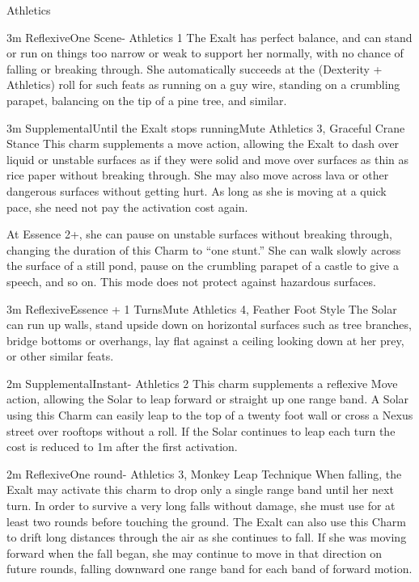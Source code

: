 \begin{Ability}{Athletics}

  {3m}
  {Reflexive}{One Scene}{-}
  {Athletics 1}
  The Exalt has perfect balance, and can stand or run on things too narrow or weak to support her normally, with no chance of falling or breaking through. She automatically succeeds at the (Dexterity + Athletics) roll for such feats as running on a guy wire, standing on a crumbling parapet, balancing on the tip of a pine tree, and similar.

  {3m}
  {Supplemental}{Until the Exalt stops running}{Mute}
  {Athletics 3, Graceful Crane Stance}
  This charm supplements a move action, allowing the Exalt to dash over liquid or unstable surfaces as if they were solid and move over surfaces as thin as rice paper without breaking through. She may also move across lava or other dangerous surfaces without getting hurt. As long as she is moving at a quick pace, she need not pay the activation cost again.

  At Essence 2+, she can pause on unstable surfaces without breaking through, changing the duration of this Charm to “one stunt.” She can walk slowly across the surface of a still pond, pause on the crumbling parapet of a castle to give a speech, and so on. This mode does not protect against hazardous surfaces.

  {3m}
  {Reflexive}{Essence + 1 Turns}{Mute}
  {Athletics 4, Feather Foot Style}
  The Solar can run up walls, stand upside down on horizontal surfaces such as tree branches, bridge bottoms or overhangs, lay flat against a ceiling looking down at her prey, or other similar feats.

  {2m}
  {Supplemental}{Instant}{-}
  {Athletics 2}
  This charm supplements a reflexive Move action, allowing the Solar to leap forward or straight up one range band. A Solar using this Charm can easily leap to the top of a twenty foot wall or cross a Nexus street over rooftops without a roll. If the Solar continues to leap each turn the cost is reduced to 1m after the first activation.

  {2m}
  {Reflexive}{One round}{-}
  {Athletics 3, Monkey Leap Technique}
  When falling, the Exalt may activate this charm to drop only a single range band until her next turn. In order to survive a very long falls without damage, she must use for at least two rounds before touching the ground. The Exalt can also use this Charm to drift long distances through the air as she continues to fall. If she was moving forward when the fall began, she may continue to move in that direction on future rounds, falling downward one range band for each band of forward motion.


\end{Ability}
